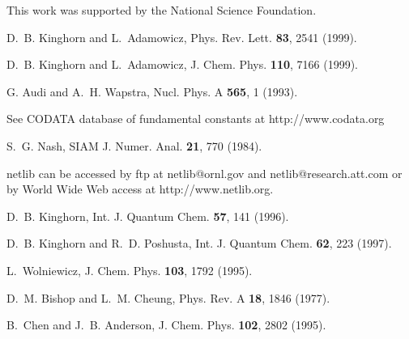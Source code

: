 \acknowledgements
This work was supported by the National Science Foundation.


\begin{references}

D.~B. Kinghorn and L.~Adamowicz,
\newblock Phys. Rev. Lett. {\bf 83}, 2541 (1999).

D.~B. Kinghorn and L.~Adamowicz,
\newblock J. Chem. Phys. {\bf 110}, 7166 (1999).

G. Audi and A.~H. Wapstra, Nucl. Phys. A {\bf 565},  1  (1993).

See CODATA database of fundamental constants at http://www.codata.org

S.~G. Nash,
\newblock SIAM J. Numer. Anal. {\bf 21}, 770 (1984).

netlib can be accessed by ftp at netlib@ornl.gov and 
netlib@research.att.com or by World Wide Web access at http://www.netlib.org.

D.~B. Kinghorn,
\newblock Int. J. Quantum Chem. {\bf 57}, 141 (1996).

D.~B. Kinghorn and R.~D. Poshusta,
\newblock Int. J. Quantum Chem. {\bf 62}, 223 (1997).

L.~Wolniewicz,
\newblock J. Chem. Phys. {\bf 103}, 1792 (1995).

D.~M. Bishop and L.~M. Cheung,
\newblock Phys. Rev. A {\bf 18}, 1846 (1977).

B.~Chen and J.~B. Anderson,
\newblock J. Chem. Phys. {\bf 102}, 2802 (1995).


\end{references}

\newpage
\mediumtext


